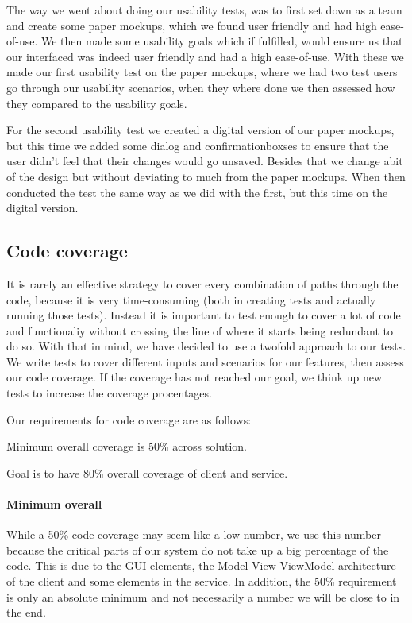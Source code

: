The way we went about doing our usability tests, was to first set down as a team and create some paper mockups, which we found user friendly and had high ease-of-use. We then made some usability goals which if fulfilled, would ensure us that our interfaced was indeed user friendly and had a high ease-of-use. With these we made our first usability test on the paper mockups, where we had two test users go through our usability scenarios, when they where done we then assessed how they compared to the usability goals.

For the second usability test we created a digital version of our paper mockups, but this time we added some dialog and confirmationboxses to ensure that the user didn't feel that their changes would go unsaved. Besides that we change abit of the design but without deviating to much from the paper mockups. When then conducted the test the same way as we did with the first, but this time on the digital version.

\subsection{Code coverage}
\label{Testing_Strategy_Coverage}
It is rarely an effective strategy to cover every combination of paths through the code, because it is very time-consuming (both in creating tests and actually running those tests). Instead it is important to test enough to cover a lot of code and functionaliy without crossing the line of where it starts being redundant to do so\cite{WoT}. With that in mind, we have decided to use a twofold approach to our tests. We write tests to cover different inputs and scenarios for our features, then assess our code coverage. If the coverage has not reached our goal, we think up new tests to increase the coverage procentages.

Our requirements for code coverage are as follows:
\begin{my_itemize}
\item Minimum overall coverage is 50\% across solution.
\item Goal is to have 80\% overall coverage of client and service.
\end{my_itemize}

\paragraph{Minimum overall}
While a 50\% code coverage may seem like a low number, we use this number because the critical parts of our system do not take up a big percentage of the code. This is due to the GUI elements, the Model-View-ViewModel architecture of the client and some elements in the service. In addition, the 50\% requirement is only an absolute minimum and not necessarily a number we will be close to in the end.

